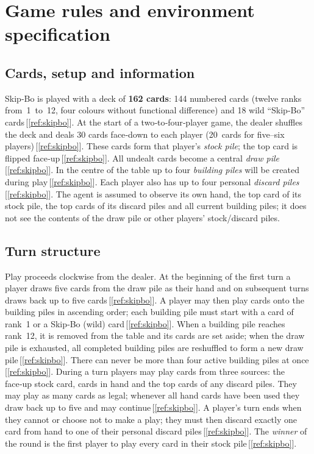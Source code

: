 \documentclass[11pt]{article}
\begin{document}
\section{Game rules and environment specification}
\subsection{Cards, setup and information}
Skip‑Bo is played with a deck of \textbf{162 cards}: 144 numbered cards (twelve ranks from 1 to 12, four colours without functional difference) and 18 wild “Skip‑Bo” cards\,[\ref{ref:skipbo}]. At the start of a two‑to‑four‑player game, the dealer shuffles the deck and deals 30 cards face‑down to each player (20 cards for five–six players)\,[\ref{ref:skipbo}]. These cards form that player’s \emph{stock pile}; the top card is flipped face‑up\,[\ref{ref:skipbo}]. All undealt cards become a central \emph{draw pile}\,[\ref{ref:skipbo}]. In the centre of the table up to four \emph{building piles} will be created during play\,[\ref{ref:skipbo}]. Each player also has up to four personal \emph{discard piles}\,[\ref{ref:skipbo}]. The agent is assumed to observe its own hand, the top card of its stock pile, the top cards of its discard piles and all current building piles; it does not see the contents of the draw pile or other players’ stock/discard piles.

\subsection{Turn structure}
Play proceeds clockwise from the dealer. At the beginning of the first turn a player draws five cards from the draw pile as their hand and on subsequent turns draws back up to five cards\,[\ref{ref:skipbo}]. A player may then play cards onto the building piles in ascending order; each building pile must start with a card of rank 1 or a Skip‑Bo (wild) card\,[\ref{ref:skipbo}]. When a building pile reaches rank 12, it is removed from the table and its cards are set aside; when the draw pile is exhausted, all completed building piles are reshuffled to form a new draw pile\,[\ref{ref:skipbo}]. There can never be more than four active building piles at once\,[\ref{ref:skipbo}]. During a turn players may play cards from three sources: the face‑up stock card, cards in hand and the top cards of any discard piles. They may play as many cards as legal; whenever all hand cards have been used they draw back up to five and may continue\,[\ref{ref:skipbo}]. A player’s turn ends when they cannot or choose not to make a play; they must then discard exactly one card from hand to one of their personal discard piles\,[\ref{ref:skipbo}]. The \emph{winner} of the round is the first player to play every card in their stock pile\,[\ref{ref:skipbo}].
\end{document}

